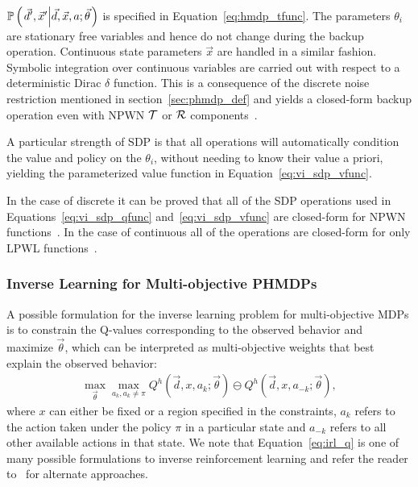 \documentclass[letterpaper]{article}
\begin{document}
{\footnotesize $\mathbb{P}\left({\left. \vec{d}', \vec{x}' \middle| \vec{d}, \vec{x}, a; \vec{\theta} \right.}\right)$ } is specified in Equation~\eqref{eq:hmdp_tfunc}. The parameters {\footnotesize $\theta_i$} are stationary free variables and hence do not change during the backup operation. Continuous state parameters {\footnotesize $ \vec{x} $} are handled in a similar fashion. Symbolic integration over continuous variables are carried out with respect to a deterministic Dirac {\footnotesize $\delta$} function. This is a consequence of the discrete noise restriction mentioned in section~\ref{sec:phmdp_def} and yields a closed-form backup operation even with NPWN {\footnotesize $\mathcal{T}$} or {\footnotesize $\mathcal{R}$} components~\cite{Sanner_UAI_2011}. 

A particular strength of SDP is that all operations will automatically condition the value and policy on the {\footnotesize $\theta_i$}, without needing to know their value a priori, yielding the parameterized value function in Equation~\eqref{eq:vi_sdp_vfunc}.

In the case of discrete {\footnotesize \Action} it can be proved that all of the SDP operations used in Equations~\eqref{eq:vi_sdp_qfunc} and~\eqref{eq:vi_sdp_vfunc} are closed-form for NPWN functions~\cite{Sanner_UAI_2011}. In the case of continuous {\footnotesize \Action} all of the operations are closed-form for only LPWL functions~\cite{Zamani_AAAI_2012}.

\subsubsection{Inverse Learning for Multi-objective PHMDPs}

A possible formulation for the inverse learning problem for multi-objective MDPs is to constrain the Q-values corresponding to the observed behavior and maximize {\footnotesize $\vec{\theta}$}, which can be interpreted as multi-objective weights that best explain the observed behavior: 
\begin{align}
\label{eq:irl_q}
\max_{\vec{\theta}} \max_{a_k, a_k \neq \pi } Q^{h} \left(\vec{d}, x, a_k; \vec{\theta} \right) \ominus Q^{h} \left(\vec{d}, x, a_{-k}; \vec{\theta} \right),
\end{align}
where {\footnotesize $ x $} can either be fixed or a region specified in the constraints, {\footnotesize $a_{k}$} refers to the action taken under the policy {\footnotesize $\pi$} in a particular state and {\footnotesize $a_{-k}$} refers to all other available actions in that state. 
We note that Equation~\eqref{eq:irl_q} is one of many possible formulations to inverse reinforcement learning and refer the reader to~\cite{Ng_ICML_2000} for alternate approaches. 
\end{document}
